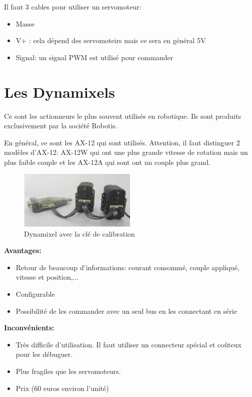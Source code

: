 \documentclass[a4paper, 11pt]{report}
\begin{document}
Il faut 3 cables pour utiliser un servomoteur:
\begin{itemize}
\item Masse
\item V+ : cela dépend des servomoteirs mais ce sera en général 5V
\item Signal: un signal PWM est utilisé pour commander 
\end{itemize}

\section{Les Dynamixels}
Ce sont les actionneurs le plus souvent utilisés en robotique. Ils sont produits exclusivement par la société Robotis.

En général, ce sont les AX-12 qui sont utilisés. Attention, il faut distinguer 2 modèles d'AX-12: AX-12W qui ont une plus grande vitesse de rotation mais un plus faible couple et les AX-12A qui sont ont un couple plus grand.

\begin{figure}[h!]
\begin{centering}
\includegraphics[width=0.5\textwidth]{images/dynamixel.jpg}
\caption{Dynamixel avec la clé de calibration}
\par\end{centering}
\end{figure}

\textbf{Avantages:}
\begin{itemize}
\item Retour de beaucoup d'informations: courant consommé, couple appliqué, vitesse et position,...
\item Configurable
\item Possibilité de les commander avec un seul bus en les connectant en série
\end{itemize}

\textbf{Inconvénients:}
\begin{itemize}
\item Très difficile d'utilisation. Il faut utiliser un connecteur spécial et coûteux pour les débuguer.
\item Plus fragiles que les servomoteurs.
\item Prix (60 euros environ l'unité)
\end{itemize} 
\end{document}
